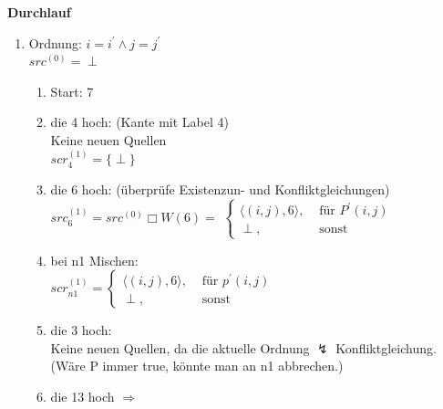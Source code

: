 \textbf{Durchlauf}\\
\begin{enumerate}
    \item {Ordnung: \(i=i^\prime \land j=j^\prime\) \\
        \(src^{(0)} = {\perp}\)\\
        \begin{enumerate}
            \item Start: 7
            \item die 4 hoch: (Kante mit Label 4)\\
                  Keine neuen Quellen\\
                  \(scr_{4}^{(1)} = \lbrace \perp \rbrace\)
            \item die 6 hoch: (überprüfe Existenzun- und Konfliktgleichungen)\\
                  \(src_{6}^{(1)} = src^{(0)} \Box W(6) = \)
    \(\begin{cases}  \langle (i,j), 6 \rangle , & \mbox{ für } P^\prime(i,j) \\
                     \perp ,                    & \mbox{ sonst }
    \end{cases}  \)

            \item bei n1 Mischen:\\
                \(scr_{n1}^{(1)} =
    \begin{cases} \langle (i,j),6 \rangle, & \mbox{ für } p^\prime(i,j) \\
                  \perp,                   & \mbox{ sonst }
                \end{cases} \)

            \item die 3 hoch:\\
                  Keine neuen Quellen, da die aktuelle Ordnung $\lightning$ Konfliktgleichung. (Wäre P immer true, könnte man an n1 abbrechen.)
            \item die 13 hoch \(\Rightarrow\)


\end{enumerate}}
\end{enumerate}
